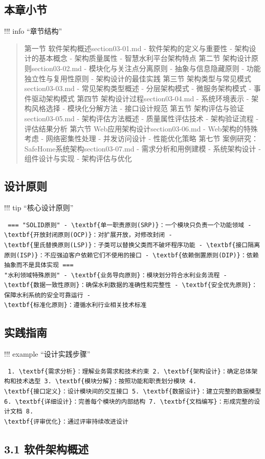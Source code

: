 \subsection{本章小节}\label{ux672cux7ae0ux5c0fux8282} !!! info ``章节结构'' \begin{quote}
 第一节 软件架构概述section03-01.md -
软件架构的定义与重要性 - 架构设计的基本概念 - 架构质量属性 - 智慧水利平台架构特点 第二节 架构设计原则section03-02.md - 模块化与关注点分离原则 - 抽象与信息隐藏原则 - 功能独立性与复用性原则 -
架构设计的最佳实践 第三节 架构类型与常见模式section03-03.md - 常见架构类型概述 - 分层架构模式 - 微服务架构模式 - 事件驱动架构模式 第四节 架构设计过程section03-04.md -
系统环境表示 - 架构风格选择 - 模块化分解方法 - 接口设计规范 第五节 架构评估与验证section03-05.md - 架构评估方法概述 - 质量属性评估技术 - 架构验证流程 - 评估结果分析 第六节
Web应用架构设计section03-06.md - Web架构的特殊考虑 - 网络密集性处理 - 并发访问设计 - 性能优化策略 第七节 案例研究：SafeHome系统架构section03-07.md -
需求分析和用例建模 - 系统架构设计 - 组件设计与实现 - 架构评估与优化 
\end{quote} \keypoints{ }\subsection{设计原则}\label{ux8bbeux8ba1ux539fux5219} !!!
tip ``核心设计原则'' \begin{verbatim} === "SOLID原则" - \textbf{单一职责原则(SRP)}：一个模块只负责一个功能领域 - \textbf{开放封闭原则(OCP)}：对扩展开放，对修改封闭 -
\textbf{里氏替换原则(LSP)}：子类可以替换父类而不破坏程序功能 - \textbf{接口隔离原则(ISP)}：不应强迫客户依赖它们不使用的接口 - \textbf{依赖倒置原则(DIP)}：依赖抽象而不是具体实现 ===
"水利领域特殊原则" - \textbf{业务导向原则}：模块划分符合水利业务流程 - \textbf{数据一致性原则}：确保水利数据的准确性和完整性 - \textbf{安全优先原则}：保障水利系统的安全可靠运行 -
\textbf{标准化原则}：遵循水利行业相关技术标准 \end{verbatim} \subsection{实践指南}\label{ux5b9eux8df5ux6307ux5357} !!! example ``设计实践步骤''
\begin{verbatim} 1. \textbf{需求分析}：理解业务需求和技术约束 2. \textbf{架构设计}：确定总体架构和技术选型 3. \textbf{模块分解}：按照功能和职责划分模块 4.
\textbf{接口定义}：设计模块间的交互接口 5. \textbf{数据设计}：建立完整的数据模型 6. \textbf{详细设计}：完善每个模块的内部结构 7. \textbf{文档编写}：形成完整的设计文档 8.
\textbf{评审优化}：通过评审持续改进设计 \end{verbatim} \subsection{3.1 软件架构概述}\label{ux8f6fux4ef6ux67b6ux6784ux6982ux8ff0}
